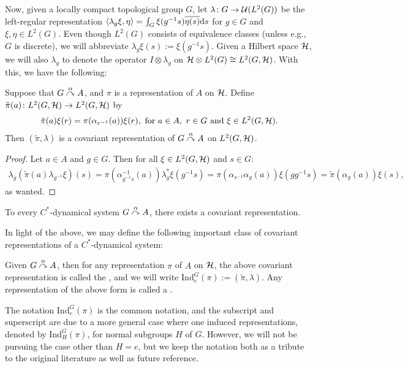 Now, given a locally compact topological group $G$, let $\lambda \colon G \to \mathcal{U}(L^2(G))$ be the left-regular representation $\langle \lambda_g \xi, \eta\rangle = \int_G \xi(g^{-1}s)\overline{\eta(s)}\mathrm{d} s$ for $g \in G$ and $\xi, \eta \in L^2(G)$. Even though $L^2(G)$ consists of equivalence classes (unless e.g., $G$ is discrete), we will abbreviate $\lambda_g \xi(s) := \xi(g^{-1}s)$. Given a Hilbert space $\mathcal{H}$, we will also $\lambda_g$ to denote the operator $I \otimes \lambda_g$ on $\mathcal{H} \otimes L^2(G) \cong L^2(G,\mathcal{H})$. With this, we have the following:
\begin{lemma}
Suppose that $G \stackrel{\alpha}{\curvearrowright} A$, and $\pi$ is a representation of $A$ on $\mathcal{H}$. Define $\tilde{\pi}(a) \colon L^2(G,\mathcal{H}) \to L^2(G,\mathcal{H})$ by 
\begin{align*}
	\tilde{\pi}(a)\xi(r) = \pi(\alpha_{r^{-1}}(a))\xi(r), \text{ for } a \in A, \ r \in G \text{ and } \xi \in L^2(G,\mathcal{H}).
\end{align*}
Then $(\tilde{\pi},\lambda)$ is a covariant representation of $G \stackrel{\alpha}{\curvearrowright} A$ on $L^2(G,\mathcal{H})$.
\label{cross:regularrep}
\end{lemma}
\begin{proof}
Let $a \in A$ and $g \in G$. Then for all $\xi \in L^2(G,\mathcal{H})$ and $s \in G$:
\begin{align*}
	\lambda_g (\tilde{\pi}(a) \lambda_{g^{-1}} \xi)(s) = \pi(\alpha_{g^{-1}s}^{-1}(a))\lambda_g^* \xi(g^{-1}s) = \pi(\alpha_{s^{-1}}\alpha_g(a))\xi (g g^{-1} s) = \tilde{\pi}(\alpha_g(a))\xi(s),
\end{align*}
as wanted.
\end{proof}
\begin{corollary}
To every $C^*$-dynamical system $G \stackrel{\alpha}{\curvearrowright} A$, there exists a covariant representation.
\end{corollary}
In light of the above, we may define the following important class of covariant representations of a $C^*$-dynamical system:
\begin{definition}
Given $G \stackrel{\alpha}{\curvearrowright} A$, then for any representation $\pi$ of $A$ on $\mathcal{H}$, the above covariant representation is called the , and we will write $\mathrm{Ind}_e^G(\pi) := (\tilde{\pi}, \lambda)$. Any representation of the above form is called a .
\end{definition}
\begin{remark}
	The notation $\mathrm{Ind}_e^G(\pi)$ is the common notation, and the subscript and superscript are due to a more general case where one induced representations, denoted by $\mathrm{Ind}_H^G(\pi)$, for normal subgroups $H$ of $G$. However, we will not be pursuing the case other than $H= e$, but we keep the notation both as a tribute to the original literature as well as future reference.
\end{remark}
